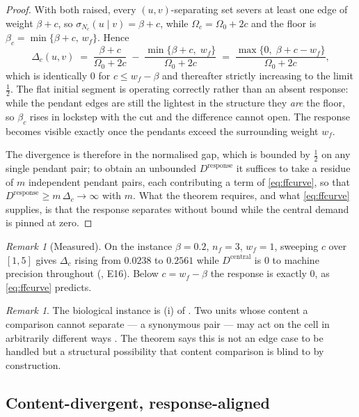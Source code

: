 \documentclass[11pt,twocolumn,a4paper]{article}
\theoremstyle{plain}
\theoremstyle{definition}
\theoremstyle{remark}
\newtheorem{remark}[theorem]{Remark}
\newcommand{\flo}{\beta}                       %
\newcommand{\sep}{\sigma}                      %
\newcommand{\Om}{\Omega}
\newcommand{\dem}{D}
\begin{document}
\begin{proof}
With both raised, every $(u,v)$-separating set severs at least one edge
of weight $\flo+c$, so $\sep_{N_c}(u\mid v)=\flo+c$, while
$\Om_c=\Om_0+2c$ and the floor is
$\flo_c=\min\{\flo+c,\,w_f\}$. Hence
\begin{equation}
\label{eq:ffcurve}
  \Delta_c(u,v)\;=\;\frac{\flo+c}{\Om_0+2c}\;-\;\frac{\min\{\flo+c,\;w_f\}}{\Om_0+2c}
  \;=\;\frac{\max\{0,\;\flo+c-w_f\}}{\Om_0+2c},
\end{equation}
which is identically $0$ for $c\le w_f-\flo$ and thereafter strictly
increasing to the limit $\tfrac12$. The flat initial segment is
 operating correctly rather than an absent response:
while the pendant edges are still the lightest in the structure they
\emph{are} the floor, so $\flo_c$ rises in lockstep with the cut and the
difference cannot open. The response becomes visible exactly once the
pendants exceed the surrounding weight $w_f$.

The divergence is therefore in the normalised gap, which is bounded by
$\tfrac12$ on any single pendant pair; to obtain an unbounded
$\dem^{\mathrm{response}}$ it suffices to take a residue of $m$
independent pendant pairs, each contributing a term of
\eqref{eq:ffcurve}, so that
$\dem^{\mathrm{response}}\ge m\,\Delta_c\to\infty$ with $m$. What the
theorem requires, and what \eqref{eq:ffcurve} supplies, is that the
response separates without bound while the central demand is pinned at
zero.
\end{proof}

\begin{remark}[Measured]
\label{rem:ffmeasured}
On the instance $\flo=0.2$, $n_f=3$, $w_f=1$, sweeping $c$ over
$[1,5]$ gives $\Delta_c$ rising from $0.0238$ to $0.2561$ while
$\dem^{\mathrm{central}}$ is $0$ to machine precision throughout
(, E16). Below $c=w_f-\flo$ the response is exactly
$0$, as \eqref{eq:ffcurve} predicts.
\end{remark}

\begin{remark}
The biological instance is (i) of . Two units whose
content a comparison cannot separate --- a synonymous pair --- may act
on the cell in arbitrarily different ways
\cite{kimchi2007silent,sauna2011silent}. The theorem says this is not an
edge case to be handled but a structural possibility that content
comparison is blind to by construction.
\end{remark}

\subsection{Content-divergent, response-aligned}
\end{document}
